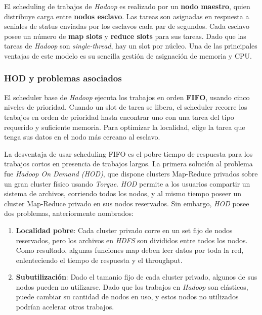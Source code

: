 \vspace{2mm}

El scheduling de trabajos de \emph{Hadoop} es realizado por un \textbf{nodo maestro}, quien distribuye carga entre \textbf{nodos esclavo}. Las tareas son asignadas en respuesta a seniales de status enviadas por los esclavos cada par de segundos. Cada esclavo posee un n\'umero de \textbf{map slots} y \textbf{reduce slots} para sus tareas. Dado que las tareas de \emph{Hadoop} son \emph{single-thread}, hay un slot por n\'ucleo. Una de las principales ventajas de este modelo es su sencilla gesti\'on de asignaci\'on de memoria y CPU.

\subsubsection{HOD y problemas asociados}

El scheduler base de \emph{Hadoop} ejecuta los trabajos en orden \textbf{FIFO}, usando cinco niveles de prioridad. Cuando un slot de tarea se libera, el scheduler recorre los trabajos en orden de prioridad hasta encontrar uno con una tarea del tipo requerido y suficiente memoria. Para optimizar la localidad, elige la tarea que tenga sus datos en el nodo m\'as cercano al esclavo.

\vspace{2mm}

La desventaja de usar scheduling FIFO es el pobre tiempo de respuesta para los trabajos cortos en presencia de trabajos largos. La primera soluci\'on al problema fue \emph{Hadoop On Demand (HOD)}, que dispone clusters Map-Reduce privados sobre un gran cluster f\'isico usando \emph{Torque}. \emph{HOD} permite a los usuarios compartir un sistema de archivos, corriendo todos los nodos, y al mismo tiempo poseer un cluster Map-Reduce privado en sus nodos reservados. Sin embargo, \emph{HOD} posee dos problemas, anteriormente nombrados:

\begin{enumerate}

\item \textbf{Localidad pobre}: Cada cluster privado corre en un set fijo de nodos reservados, pero los archivos en \emph{HDFS} son divididos entre todos los nodos. Como resultado, algunas funciones map deben leer datos por toda la red, enlenteciendo el tiempo de respuesta y el throughput. 

\item \textbf{Subutilizaci\'on}: Dado el tamanio fijo de cada cluster privado, algunos de sus nodos pueden no utilizarse. Dado que los trabajos en \emph{Hadoop} son el\'asticos, puede cambiar su cantidad de nodos en uso, y estos nodos no utilizados podr\'ian acelerar otros trabajos. 

\end{enumerate}


